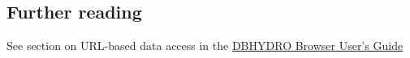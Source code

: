 \documentclass[12pt,notitlepage]{article}
\begin{document}
\subsection{Further reading}
See section on URL-based data access in the \href{http://www.sfwmd.gov/portal/page/portal/xrepository/sfwmd_repository_pdf/dbhydrobrowseruserdocumentation.pdf}{DBHYDRO Browser User's Guide}

\medskip
 


 
\end{document}
